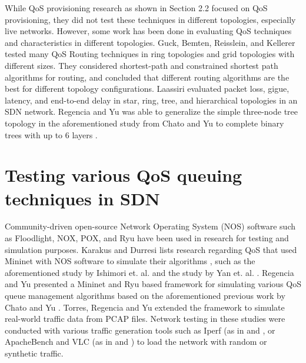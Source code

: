 While QoS provisioning research as shown in Section 2.2 focused on QoS provisioning, they did not test these techniques in different topologies, especially live networks. However, some work has been done in evaluating QoS techniques and characteristics in different topologies. Guck, Bemten, Reisslein, and Kellerer \cite{guck_unicast_2018} tested many QoS Routing techniques in ring topologies and grid topologies with different sizes. They considered shortest-path and constrained shortest path algorithms for routing, and concluded that different routing algorithms are the best for different topology configurations. Laassiri \cite{laassiri_evaluation_2017} evaluated packet loss, gigue, latency, and end-to-end delay in star, ring, tree, and hierarchical topologies in an SDN network. Regencia and Yu was able to generalize the simple three-node tree topology in the aforementioned study from Chato and Yu to complete binary trees with up to 6 layers \cite{yang_introducing_2022}.

\section{Testing various QoS queuing techniques in SDN}
Community-driven open-source Network Operating System (NOS) software such as Floodlight, NOX, POX, and Ryu have been used in research for testing and simulation purposes. Karakus and Durresi lists research regarding QoS that used Mininet with NOS software to simulate their algorithms \cite{karakus_quality_2017}, such as the aforementioned study by Ishimori et. al. \cite{ishimori_control_2013} and the study by Yan et. al. \cite{yan_hiqos_2015}. Regencia and Yu \cite{yang_introducing_2022} presented a Mininet and Ryu based framework for simulating various QoS queue management algorithms based on the aforementioned previous work by Chato and Yu \cite{chato_exploration_2016}. Torres, Regencia and Yu \cite{kim_real_2021} extended the framework to simulate real-world traffic data from PCAP files. Network testing in these studies were conducted with various traffic generation tools such as Iperf (as in \cite{yan_hiqos_2015} and \cite{ishimori_control_2013}, or ApacheBench and VLC (as in \cite{chato_exploration_2016} and \cite{kim_real_2021}) to load the network with random or synthetic traffic.

